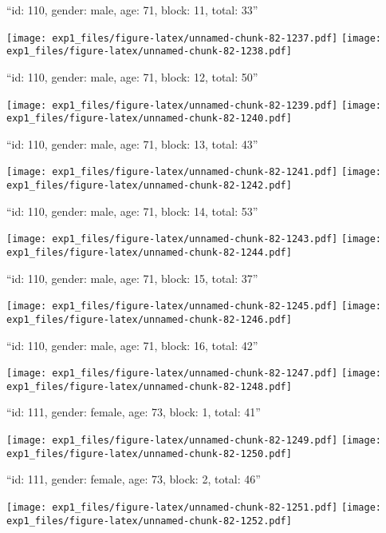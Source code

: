 \documentclass[11pt,,]{article}
\begin{document}
\newpage
[1] 

``id: 110, gender: male, age: 71, block: 11, total: 33''

\texttt{[image: exp1\_files/figure-latex/unnamed-chunk-82-1237.pdf]}
\texttt{[image: exp1\_files/figure-latex/unnamed-chunk-82-1238.pdf]}

\newpage
[1] 

``id: 110, gender: male, age: 71, block: 12, total: 50''

\texttt{[image: exp1\_files/figure-latex/unnamed-chunk-82-1239.pdf]}
\texttt{[image: exp1\_files/figure-latex/unnamed-chunk-82-1240.pdf]}

\newpage
[1] 

``id: 110, gender: male, age: 71, block: 13, total: 43''

\texttt{[image: exp1\_files/figure-latex/unnamed-chunk-82-1241.pdf]}
\texttt{[image: exp1\_files/figure-latex/unnamed-chunk-82-1242.pdf]}

\newpage
[1] 

``id: 110, gender: male, age: 71, block: 14, total: 53''

\texttt{[image: exp1\_files/figure-latex/unnamed-chunk-82-1243.pdf]}
\texttt{[image: exp1\_files/figure-latex/unnamed-chunk-82-1244.pdf]}

\newpage
[1] 

``id: 110, gender: male, age: 71, block: 15, total: 37''

\texttt{[image: exp1\_files/figure-latex/unnamed-chunk-82-1245.pdf]}
\texttt{[image: exp1\_files/figure-latex/unnamed-chunk-82-1246.pdf]}

\newpage
[1] 

``id: 110, gender: male, age: 71, block: 16, total: 42''

\texttt{[image: exp1\_files/figure-latex/unnamed-chunk-82-1247.pdf]}
\texttt{[image: exp1\_files/figure-latex/unnamed-chunk-82-1248.pdf]}

\newpage
[1] 

``id: 111, gender: female, age: 73, block: 1, total: 41''

\texttt{[image: exp1\_files/figure-latex/unnamed-chunk-82-1249.pdf]}
\texttt{[image: exp1\_files/figure-latex/unnamed-chunk-82-1250.pdf]}

\newpage
[1] 

``id: 111, gender: female, age: 73, block: 2, total: 46''

\texttt{[image: exp1\_files/figure-latex/unnamed-chunk-82-1251.pdf]}
\texttt{[image: exp1\_files/figure-latex/unnamed-chunk-82-1252.pdf]}
\end{document}
